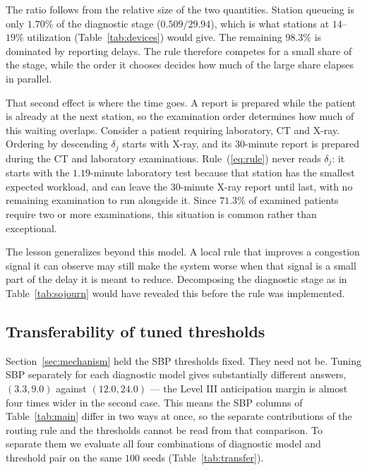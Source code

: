 \documentclass[sigconf]{acmart}
\begin{document}
The ratio follows from the relative size of the two quantities. Station
queueing is only $1.70\%$ of the diagnostic stage ($0.509/29.94$), which is
what stations at $14$--$19\%$ utilization (Table~\ref{tab:devices}) would give.
The remaining $98.3\%$ is dominated by reporting delays. The rule therefore
competes for a small share of the stage, while the order it chooses decides how
much of the large share elapses in parallel.

That second effect is where the time goes. A report is prepared while the
patient is already at the next station, so the examination order determines how
much of this waiting overlaps. Consider a patient requiring laboratory, CT and
X-ray. Ordering by descending $\delta_j$ starts with X-ray, and its $30$-minute
report is prepared during the CT and laboratory examinations.
Rule~(\ref{eq:rule}) never reads $\delta_j$: it starts with the $1.19$-minute
laboratory test because that station has the smallest expected workload, and
can leave the $30$-minute X-ray report until last, with no remaining
examination to run alongside it. Since $71.3\%$ of examined patients require two
or more examinations, this situation is common rather than exceptional.

The lesson generalizes beyond this model. A local rule that improves a
congestion signal it can observe may still make the system worse when that
signal is a small part of the delay it is meant to reduce. Decomposing the
diagnostic stage as in Table~\ref{tab:sojourn} would have revealed this before
the rule was implemented.

\subsection{Transferability of tuned thresholds}
\label{sec:transfer}

Section~\ref{sec:mechanism} held the SBP thresholds fixed. They need not be.
Tuning SBP separately for each diagnostic model gives substantially different
answers, $(3.3,9.0)$ against $(12.0,24.0)$ --- the Level III anticipation
margin is almost four times wider in the second case. This means the SBP
columns of Table~\ref{tab:main} differ in two ways at once, so the separate
contributions of the routing rule and the thresholds cannot be read from that
comparison. To separate them we evaluate all four combinations of diagnostic
model and threshold pair on the same $100$ seeds (Table~\ref{tab:transfer}).
\end{document}
